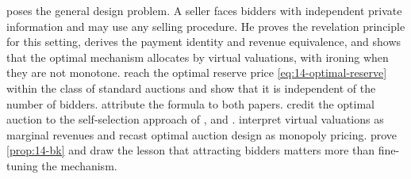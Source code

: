  \citet{Myerson1981} poses the general design problem. A seller faces bidders with independent private information and may use any selling procedure. He proves the revelation principle for this setting, derives the payment identity and revenue equivalence, and shows that the optimal mechanism allocates by virtual valuations, with ironing when they are not monotone.
 reach the optimal reserve price \eqref{eq:14-optimal-reserve} within the class of standard auctions and show that it is independent of the number of bidders.  attribute the formula to both papers.  credit the optimal auction to the self-selection approach of \citet{HarrisRaviv1981}, \citet{Myerson1981} and \citet{RileySamuelson1981}.  interpret virtual valuations as marginal revenues and recast optimal auction design as monopoly pricing.  prove \cref{prop:14-bk} and draw the lesson that attracting bidders matters more than fine-tuning the mechanism.
